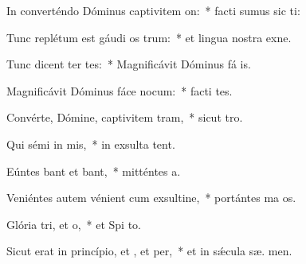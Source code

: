 \item In converténdo Dóminus captivitem on:~* facti sumus sic ti:
\item Tunc replétum est gáudi os trum:~* et lingua nostra exne.
\item Tunc dicent ter tes:~* Magnificávit Dóminus fá  is.
\item Magnificávit Dóminus fáce nocum:~* facti  tes.
\item Convérte, Dómine, captivitem tram,~* sicut   tro.
\item Qui sémi in mis,~* in exsulta tent.
\item Eúntes bant et bant,~* mitténtes  a.
\item Veniéntes autem vénient cum exsultine,~* portántes ma os.
\item Glória tri, et o,~* et Spi to.
\item Sicut erat in princípio, et , et per,~* et in sǽcula sæ. men.
